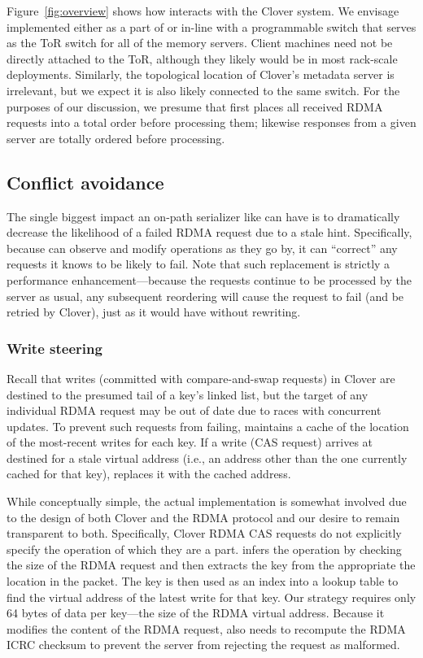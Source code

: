 Figure~\ref{fig:overview} shows how {\sword} interacts with the Clover
system.  We envisage {\sword} implemented either as a part of or in-line with
a programmable switch that serves as the ToR switch
for all of the memory servers.  Client machines need not be directly
attached to the ToR, although they likely would be in most rack-scale
deployments.  Similarly, the topological location of Clover's metadata
server is irrelevant, but we expect it is also likely connected to the
same switch.  For the purposes of our discussion, we presume that
{\sword} first places all received RDMA requests into a total order
before processing them; likewise responses from a given 
server are totally ordered before processing.

\subsection{Conflict avoidance}

The single biggest impact an on-path serializer like {\sword} can have
is to dramatically decrease the likelihood of a failed RDMA request due
to a stale hint.  Specifically, because {\sword} can observe and
modify operations as they go by, it can ``correct'' any requests it
knows to be likely to fail.  Note that such replacement is strictly a
performance enhancement---because the requests continue to be
processed by the server as usual, any subsequent reordering will
cause the request to fail (and be retried by Clover), just as
it would have without rewriting.

\subsubsection{Write steering}

Recall that writes (committed with compare-and-swap requests) in
Clover are destined to the presumed tail of a key's linked list, but
the target of any individual RDMA request may be out of date due to
races with concurrent updates.  To prevent such requests from
failing, {\sword} maintains a cache of the location of the most-recent writes
for each key. If a write (CAS request) arrives at {\sword}
destined for a stale virtual address (i.e., an address other than the
one currently cached for that key), {\sword} replaces it with
the cached address.

While conceptually simple, the actual implementation is somewhat
involved due to the design of both Clover and the RDMA protocol and
our desire to remain transparent to both.  Specifically, Clover RDMA
CAS requests do not explicitly specify the operation of which they are
a part.  {\sword} infers the operation by checking the size of the
RDMA request and then extracts the key from the appropriate the
location in the packet.  The key is then used as an index into a
lookup table to find the virtual address of the latest write for that
key.  Our strategy requires only 64 bytes of data per key---the size
of the RDMA virtual address.  Because it modifies the content of the
RDMA request, {\sword} also needs to recompute the RDMA ICRC checksum
to prevent the server from rejecting the request as malformed.

